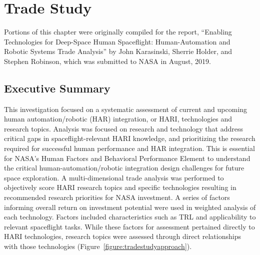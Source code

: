 \chapter{Trade Study}
\label{chapter:tradestudy}

Portions of this chapter were originally compiled for the report, ``Enabling Technologies for Deep-Space Human Spaceflight: Human-Automation and Robotic Systems Trade Analysis'' by John Karasinski, Sherrie Holder, and Stephen Robinson, which was submitted to NASA in August, 2019.






\section{Executive Summary}
This investigation focused on a systematic assessment of current and upcoming human automation/robotic (HAR) integration, or HARI, technologies and research topics.
Analysis was focused on research and technology that address critical gaps in spaceflight-relevant HARI knowledge, and prioritizing the research required for successful human performance and HAR integration.
This is essential for NASA's Human Factors and Behavioral Performance Element to understand the critical human-automation/robotic integration design challenges for future space exploration.
A multi-dimensional trade analysis was performed to objectively score HARI research topics and specific technologies resulting in recommended research priorities for NASA investment.
A series of factors informing overall return on investment potential were used in weighted analysis of each technology.
Factors included characteristics such as TRL and applicability to relevant spaceflight tasks.
While these factors for assessment pertained directly to HARI technologies, research topics were assessed through direct relationships with those technologies (Figure~\ref{figure:tradestudyapproach}).

